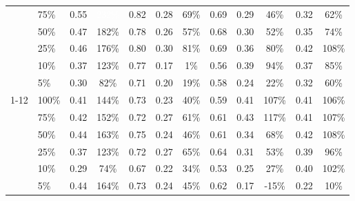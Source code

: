 \begin{longtable}{llcccccccccc}
 & 75\% & 0.55 & \cellcolor{tablegreen!66}\textcolor{white}{232\%} & 0.82 & 0.28 & \cellcolor{tablegreen!20}69\% & 0.69 & 0.29 & \cellcolor{tablegreen!13}46\% & 0.32 & \cellcolor{tablegreen!18}62\% \\
 & 50\% & 0.47 & \cellcolor{tablegreen!52}182\% & 0.78 & 0.26 & \cellcolor{tablegreen!16}57\% & 0.68 & 0.30 & \cellcolor{tablegreen!15}52\% & 0.35 & \cellcolor{tablegreen!21}74\% \\
 & 25\% & 0.46 & \cellcolor{tablegreen!50}176\% & 0.80 & 0.30 & \cellcolor{tablegreen!23}81\% & 0.69 & 0.36 & \cellcolor{tablegreen!23}80\% & 0.42 & \cellcolor{tablegreen!31}108\% \\
 & 10\% & 0.37 & \cellcolor{tablegreen!35}123\% & 0.77 & 0.17 & \cellcolor{tablegreen!0}1\% & 0.56 & 0.39 & \cellcolor{tablegreen!27}94\% & 0.37 & \cellcolor{tablegreen!24}85\% \\
 & 5\% & 0.30 & \cellcolor{tablegreen!23}82\% & 0.71 & 0.20 & \cellcolor{tablegreen!6}19\% & 0.58 & 0.24 & \cellcolor{tablegreen!6}22\% & 0.32 & \cellcolor{tablegreen!17}60\% \\
\cmidrule(l){1-12}
\multirow{6}{*}{granite} & 100\% & 0.41 & \cellcolor{tablegreen!41}144\% & 0.73 & 0.23 & \cellcolor{tablegreen!11}40\% & 0.59 & 0.41 & \cellcolor{tablegreen!31}107\% & 0.41 & \cellcolor{tablegreen!30}106\% \\
 & 75\% & 0.42 & \cellcolor{tablegreen!43}152\% & 0.72 & 0.27 & \cellcolor{tablegreen!18}61\% & 0.61 & 0.43 & \cellcolor{tablegreen!33}117\% & 0.41 & \cellcolor{tablegreen!31}107\% \\
 & 50\% & 0.44 & \cellcolor{tablegreen!47}163\% & 0.75 & 0.24 & \cellcolor{tablegreen!13}46\% & 0.61 & 0.34 & \cellcolor{tablegreen!19}68\% & 0.42 & \cellcolor{tablegreen!31}108\% \\
 & 25\% & 0.37 & \cellcolor{tablegreen!35}123\% & 0.72 & 0.27 & \cellcolor{tablegreen!19}65\% & 0.64 & 0.31 & \cellcolor{tablegreen!15}53\% & 0.39 & \cellcolor{tablegreen!28}96\% \\
 & 10\% & 0.29 & \cellcolor{tablegreen!21}74\% & 0.67 & 0.22 & \cellcolor{tablegreen!10}34\% & 0.53 & 0.25 & \cellcolor{tablegreen!8}27\% & 0.40 & \cellcolor{tablegreen!29}102\% \\
 & 5\% & 0.44 & \cellcolor{tablegreen!47}164\% & 0.73 & 0.24 & \cellcolor{tablegreen!13}45\% & 0.62 & 0.17 & \cellcolor[HTML]{E8A0A0}-15\% & 0.22 & \cellcolor{tablegreen!3}10\% \\
\end{longtable}
\endgroup